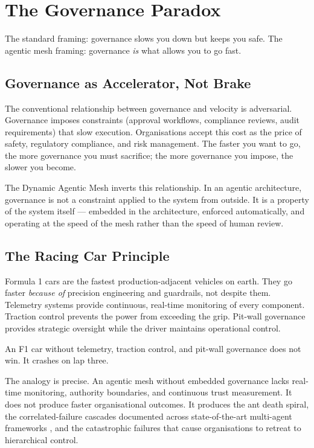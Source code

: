 \chapter{The Governance Paradox}
\label{ch:governance}

\epigraph{The standard framing: governance slows you down but keeps you safe. The agentic mesh framing: governance \emph{is} what allows you to go fast.}{}

\section{Governance as Accelerator, Not Brake}

The conventional relationship between governance and velocity is adversarial. Governance imposes constraints (approval workflows, compliance reviews, audit requirements) that slow execution. Organisations accept this cost as the price of safety, regulatory compliance, and risk management. The faster you want to go, the more governance you must sacrifice; the more governance you impose, the slower you become.

The Dynamic Agentic Mesh inverts this relationship. In an agentic architecture, governance is not a constraint applied to the system from outside. It is a property of the system itself --- embedded in the architecture, enforced automatically, and operating at the speed of the mesh rather than the speed of human review.

\section{The Racing Car Principle}

Formula 1 cars are the fastest production-adjacent vehicles on earth. They go faster \emph{because of} precision engineering and guardrails, not despite them. Telemetry systems provide continuous, real-time monitoring of every component. Traction control prevents the power from exceeding the grip. Pit-wall governance provides strategic oversight while the driver maintains operational control.

An F1 car without telemetry, traction control, and pit-wall governance does not win. It crashes on lap three.

The analogy is precise. An agentic mesh without embedded governance lacks real-time monitoring, authority boundaries, and continuous trust measurement. It does not produce faster organisational outcomes. It produces the ant death spiral, the correlated-failure cascades documented across state-of-the-art multi-agent frameworks \parencite{Cemri2025}, and the catastrophic failures that cause organisations to retreat to hierarchical control.

